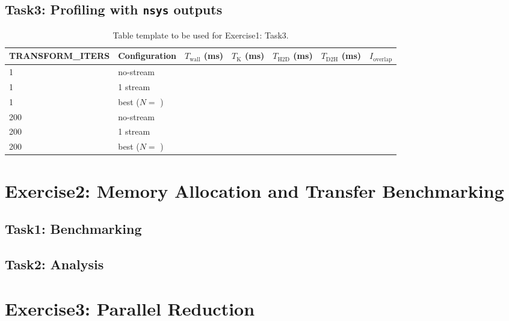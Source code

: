 \documentclass[a4paper,%
11pt,%
DIV12,
headsepline,%
headings=normal,
]{scrartcl}
\begin{document}
\subsection{Task3: Profiling with \texttt{nsys} outputs}
\begin{table}[h]
\centering
\footnotesize
\begin{tabular}{llrrrrc}
\toprule
\textbf{{TRANSFORM\_ITERS}} & \textbf{Configuration} &
$T_{\text{wall}}$ (ms) & $T_{\text{K}}$ (ms) &
$T_{\text{H2D}}$ (ms) & $T_{\text{D2H}}$ (ms) &
$I_{\text{overlap}}$ \\
\midrule
1   & no-stream      & \todo{} & \todo{} & \todo{} & \todo{} & \todo{} \\
1   & 1 stream       & \todo{} & \todo{} & \todo{} & \todo{} & \todo{} \\
1   & best ($N=$ \todo{}) & \todo{} & \todo{} & \todo{} & \todo{} & \todo{} \\
\midrule
200 & no-stream      & \todo{} & \todo{} & \todo{} & \todo{} & \todo{} \\
200 & 1 stream       & \todo{} & \todo{} & \todo{} & \todo{} & \todo{} \\
200 & best ($N=$ \todo{}) & \todo{} & \todo{} & \todo{} & \todo{} & \todo{} \\
\bottomrule
\end{tabular}
\caption{Table template to be used for Exercise1: Task3.}
\label{tab:overlap}
\end{table}

\section{Exercise2: Memory Allocation and Transfer Benchmarking}

\subsection{Task1: Benchmarking}

\subsection{Task2: Analysis}

\section{Exercise3: Parallel Reduction}
\end{document}
